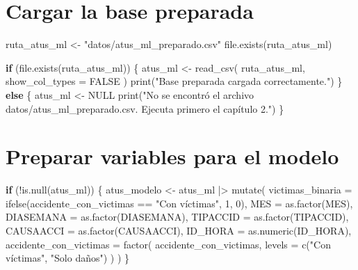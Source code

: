 \documentclass[
  11pt,
  letterpaper,
]{book}
\newenvironment{Shaded}{\begin{snugshade}}{\end{snugshade}}
\newcommand{\AttributeTok}[1]{\textcolor[rgb]{0.40,0.45,0.13}{#1}}
\newcommand{\ConstantTok}[1]{\textcolor[rgb]{0.56,0.35,0.01}{#1}}
\newcommand{\ControlFlowTok}[1]{\textcolor[rgb]{0.00,0.23,0.31}{\textbf{#1}}}
\newcommand{\DecValTok}[1]{\textcolor[rgb]{0.68,0.00,0.00}{#1}}
\newcommand{\FunctionTok}[1]{\textcolor[rgb]{0.28,0.35,0.67}{#1}}
\newcommand{\NormalTok}[1]{\textcolor[rgb]{0.00,0.23,0.31}{#1}}
\newcommand{\OtherTok}[1]{\textcolor[rgb]{0.00,0.23,0.31}{#1}}
\newcommand{\SpecialCharTok}[1]{\textcolor[rgb]{0.37,0.37,0.37}{#1}}
\newcommand{\StringTok}[1]{\textcolor[rgb]{0.13,0.47,0.30}{#1}}
\begin{document}
\section{Cargar la base preparada}\label{cargar-la-base-preparada-1}

\begin{Shaded}
\begin{Highlighting}[]
\NormalTok{ruta\_atus\_ml }\OtherTok{\textless{}{-}} \StringTok{"datos/atus\_ml\_preparado.csv"}
\FunctionTok{file.exists}\NormalTok{(ruta\_atus\_ml)}
\end{Highlighting}
\end{Shaded}

\begin{Shaded}
\begin{Highlighting}[]
\ControlFlowTok{if}\NormalTok{ (}\FunctionTok{file.exists}\NormalTok{(ruta\_atus\_ml)) \{}
\NormalTok{  atus\_ml }\OtherTok{\textless{}{-}} \FunctionTok{read\_csv}\NormalTok{(}
\NormalTok{    ruta\_atus\_ml,}
    \AttributeTok{show\_col\_types =} \ConstantTok{FALSE}
\NormalTok{  )}
  \FunctionTok{print}\NormalTok{(}\StringTok{"Base preparada cargada correctamente."}\NormalTok{)}
\NormalTok{\} }\ControlFlowTok{else}\NormalTok{ \{}
\NormalTok{  atus\_ml }\OtherTok{\textless{}{-}} \ConstantTok{NULL}
  \FunctionTok{print}\NormalTok{(}\StringTok{"No se encontró el archivo datos/atus\_ml\_preparado.csv. Ejecuta primero el capítulo 2."}\NormalTok{)}
\NormalTok{\}}
\end{Highlighting}
\end{Shaded}

\section{Preparar variables para el
modelo}\label{preparar-variables-para-el-modelo}

\begin{Shaded}
\begin{Highlighting}[]
\ControlFlowTok{if}\NormalTok{ (}\SpecialCharTok{!}\FunctionTok{is.null}\NormalTok{(atus\_ml)) \{}
\NormalTok{  atus\_modelo }\OtherTok{\textless{}{-}}\NormalTok{ atus\_ml }\SpecialCharTok{|\textgreater{}}
    \FunctionTok{mutate}\NormalTok{(}
      \AttributeTok{victimas\_binaria =} \FunctionTok{ifelse}\NormalTok{(accidente\_con\_victimas }\SpecialCharTok{==} \StringTok{"Con víctimas"}\NormalTok{, }\DecValTok{1}\NormalTok{, }\DecValTok{0}\NormalTok{),}
      \AttributeTok{MES =} \FunctionTok{as.factor}\NormalTok{(MES),}
      \AttributeTok{DIASEMANA =} \FunctionTok{as.factor}\NormalTok{(DIASEMANA),}
      \AttributeTok{TIPACCID =} \FunctionTok{as.factor}\NormalTok{(TIPACCID),}
      \AttributeTok{CAUSAACCI =} \FunctionTok{as.factor}\NormalTok{(CAUSAACCI),}
      \AttributeTok{ID\_HORA =} \FunctionTok{as.numeric}\NormalTok{(ID\_HORA),}
      \AttributeTok{accidente\_con\_victimas =} \FunctionTok{factor}\NormalTok{(}
\NormalTok{        accidente\_con\_victimas,}
        \AttributeTok{levels =} \FunctionTok{c}\NormalTok{(}\StringTok{"Con víctimas"}\NormalTok{, }\StringTok{"Solo daños"}\NormalTok{)}
\NormalTok{      )}
\NormalTok{    )}
\NormalTok{\}}
\end{Highlighting}
\end{Shaded}
\end{document}
